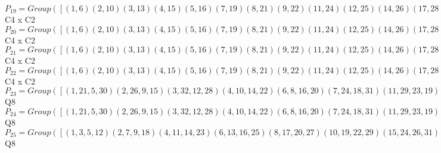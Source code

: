 \documentclass[varwidth=\maxdimen,border=10]{standalone}
\begin{document}
\begin{tabular}
$P_{19} = Group( [ ( 1, 6)( 2,10)( 3,13)( 4,15)( 5,16)( 7,19)( 8,21)( 9,22)(11,24)(12,25)(14,26)(17,28)(18,29)(20,30)(23,31)(27,32), ( 1, 5)( 2, 9)( 3,12)( 4,14)( 6,16)( 7,18)( 8,20)(10,22)(11,23)(13,25)(15,26)(17,27)(19,29)(21,30)(24,31)(28,32), ( 1,18, 5, 7)( 2, 3, 9,12)( 4,32,14,28)( 6,29,16,19)( 8,24,20,31)(10,13,22,25)(11,30,23,21)(15,27,26,17) ] )\cong$ C4 x C2\ \\
$P_{20} = Group( [ ( 1, 6)( 2,10)( 3,13)( 4,15)( 5,16)( 7,19)( 8,21)( 9,22)(11,24)(12,25)(14,26)(17,28)(18,29)(20,30)(23,31)(27,32), ( 1, 5)( 2, 9)( 3,12)( 4,14)( 6,16)( 7,18)( 8,20)(10,22)(11,23)(13,25)(15,26)(17,27)(19,29)(21,30)(24,31)(28,32), ( 1, 3, 5,12)( 2, 7, 9,18)( 4,11,14,23)( 6,13,16,25)( 8,17,20,27)(10,19,22,29)(15,24,26,31)(21,28,30,32) ] )\cong$ C4 x C2\ \\
$P_{21} = Group( [ ( 1, 6)( 2,10)( 3,13)( 4,15)( 5,16)( 7,19)( 8,21)( 9,22)(11,24)(12,25)(14,26)(17,28)(18,29)(20,30)(23,31)(27,32), ( 1, 5)( 2, 9)( 3,12)( 4,14)( 6,16)( 7,18)( 8,20)(10,22)(11,23)(13,25)(15,26)(17,27)(19,29)(21,30)(24,31)(28,32), ( 1,32, 5,28)( 2,24, 9,31)( 3,30,12,21)( 4,29,14,19)( 6,27,16,17)( 7,15,18,26)( 8,13,20,25)(10,11,22,23) ] )\cong$ C4 x C2\ \\
$P_{22} = Group( [ ( 1, 6)( 2,10)( 3,13)( 4,15)( 5,16)( 7,19)( 8,21)( 9,22)(11,24)(12,25)(14,26)(17,28)(18,29)(20,30)(23,31)(27,32), ( 1, 5)( 2, 9)( 3,12)( 4,14)( 6,16)( 7,18)( 8,20)(10,22)(11,23)(13,25)(15,26)(17,27)(19,29)(21,30)(24,31)(28,32), ( 1, 4, 6,15)( 2, 8,10,21)( 3,11,13,24)( 5,14,16,26)( 7,17,19,28)( 9,20,22,30)(12,23,25,31)(18,27,29,32) ] )\cong$ C4 x C2\ \\
$P_{23} = Group( [ ( 1,21, 5,30)( 2,26, 9,15)( 3,32,12,28)( 4,10,14,22)( 6, 8,16,20)( 7,24,18,31)(11,29,23,19)(13,27,25,17), ( 1,13, 5,25)( 2,19, 9,29)( 3,16,12, 6)( 4,24,14,31)( 7,22,18,10)( 8,28,20,32)(11,26,23,15)(17,30,27,21), ( 1, 5)( 2, 9)( 3,12)( 4,14)( 6,16)( 7,18)( 8,20)(10,22)(11,23)(13,25)(15,26)(17,27)(19,29)(21,30)(24,31)(28,32) ] )\cong$ Q8\ \\
$P_{24} = Group( [ ( 1,21, 5,30)( 2,26, 9,15)( 3,32,12,28)( 4,10,14,22)( 6, 8,16,20)( 7,24,18,31)(11,29,23,19)(13,27,25,17), ( 1, 3, 5,12)( 2, 7, 9,18)( 4,11,14,23)( 6,13,16,25)( 8,17,20,27)(10,19,22,29)(15,24,26,31)(21,28,30,32), ( 1, 5)( 2, 9)( 3,12)( 4,14)( 6,16)( 7,18)( 8,20)(10,22)(11,23)(13,25)(15,26)(17,27)(19,29)(21,30)(24,31)(28,32) ] )\cong$ Q8\ \\
$P_{25} = Group( [ ( 1, 3, 5,12)( 2, 7, 9,18)( 4,11,14,23)( 6,13,16,25)( 8,17,20,27)(10,19,22,29)(15,24,26,31)(21,28,30,32), ( 1, 2, 5, 9)( 3,18,12, 7)( 4,21,14,30)( 6,10,16,22)( 8,26,20,15)(11,32,23,28)(13,29,25,19)(17,24,27,31), ( 1, 5)( 2, 9)( 3,12)( 4,14)( 6,16)( 7,18)( 8,20)(10,22)(11,23)(13,25)(15,26)(17,27)(19,29)(21,30)(24,31)(28,32) ] )\cong$ Q8\ \\

\end{tabular}
\end{document}
